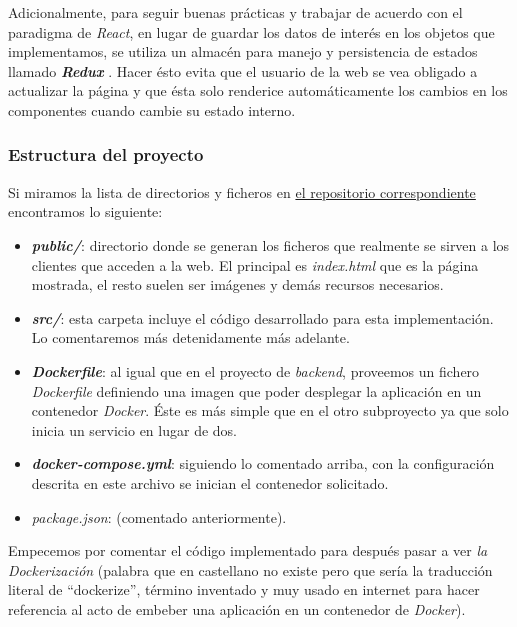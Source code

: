 Adicionalmente, para seguir buenas prácticas y trabajar de acuerdo con el paradigma de \textit{React}, en lugar de guardar los datos de interés en los objetos que implementamos, se utiliza un almacén para manejo y persistencia de estados llamado \textbf{\textit{Redux}} \cite{redux}. Hacer ésto evita que el usuario de la web se vea obligado a actualizar la página y que ésta solo renderice automáticamente los cambios en los componentes cuando cambie su estado interno.\\


\subsubsection{Estructura del proyecto}

Si miramos la lista de directorios y ficheros en \href{https://github.com/adrianmorente/lazarillo-admin-frontend}{el repositorio correspondiente} encontramos lo siguiente:\\

\begin{itemize}
	\item \textbf{\textit{public/}}: directorio donde se generan los ficheros que realmente se sirven a los clientes que acceden a la web. El principal es \textit{index.html} que es la página mostrada, el resto suelen ser imágenes y demás recursos necesarios.
	\item \textbf{\textit{src/}}: esta carpeta incluye el código desarrollado para esta implementación. Lo comentaremos más detenidamente más adelante.
	\item \textbf{\textit{Dockerfile}}: al igual que en el proyecto de \textit{backend}, proveemos un fichero \textit{Dockerfile} definiendo una imagen que poder desplegar la aplicación en un contenedor \textit{Docker}. Éste es más simple que en el otro subproyecto ya que solo inicia un servicio en lugar de dos.
	\item \textbf{\textit{docker-compose.yml}}: siguiendo lo comentado arriba, con la configuración descrita en este archivo se inician el contenedor solicitado.
	\item \textit{package.json}: (comentado anteriormente).
\end{itemize}

Empecemos por comentar el código implementado para después pasar a ver \textit{la Dockerización} (palabra que en castellano no existe pero que sería la traducción literal de ``dockerize'', término inventado y muy usado en internet para hacer referencia al acto de embeber una aplicación en un contenedor de \textit{Docker}).\\


